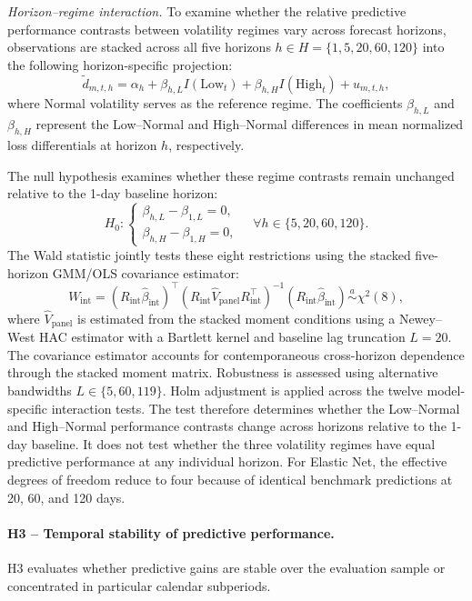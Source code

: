 \documentclass[runningheads,orivec]{llncs}
\begin{document}
\textit{Horizon--regime interaction.} To examine whether the relative predictive performance contrasts between volatility regimes vary across forecast horizons, observations are stacked across all five horizons $h\in H=\{1,5,20,60,120\}$ into the following horizon-specific projection:
\begin{equation}
\widetilde d_{m,t,h}
=
\alpha_h+\beta_{h,L}I(\mathrm{Low}_t)
+\beta_{h,H}I(\mathrm{High}_t)+u_{m,t,h},
\end{equation}
where Normal volatility serves as the reference regime. The coefficients $\beta_{h,L}$ and $\beta_{h,H}$ represent the Low--Normal and High--Normal differences in mean normalized loss differentials at horizon $h$, respectively.

The null hypothesis examines whether these regime contrasts remain unchanged relative to the 1-day baseline horizon:
\begin{equation}
H_0:
\begin{cases}
\beta_{h,L}-\beta_{1,L}=0,\\
\beta_{h,H}-\beta_{1,H}=0,
\end{cases}
\quad
\forall h\in\{5,20,60,120\}.
\end{equation}
The Wald statistic jointly tests these eight restrictions using the stacked five-horizon GMM/OLS covariance estimator:
\begin{equation}
W_{\mathrm{int}}
=
(R_{\mathrm{int}}\widehat\beta_{\mathrm{int}})^\top
\left(
R_{\mathrm{int}}\widehat V_{\mathrm{panel}}
R_{\mathrm{int}}^\top
\right)^{-1}
(R_{\mathrm{int}}\widehat\beta_{\mathrm{int}})
\overset{a}{\sim}\chi^2(8),
\end{equation}
where $\widehat V_{\mathrm{panel}}$ is estimated from the stacked moment conditions using a Newey--West HAC estimator with a Bartlett kernel and baseline lag truncation $L=20$. The covariance estimator accounts for contemporaneous cross-horizon dependence through the stacked moment matrix. Robustness is assessed using alternative bandwidths $L\in\{5,60,119\}$. Holm adjustment is applied across the twelve model-specific interaction tests. The test therefore determines whether the Low--Normal and High--Normal performance contrasts change across horizons relative to the 1-day baseline. It does not test whether the three volatility regimes have equal predictive performance at any individual horizon. For Elastic Net, the effective degrees of freedom reduce to four because of identical benchmark predictions at 20, 60, and 120 days.

\paragraph{H3 -- Temporal stability of predictive performance.} H3 evaluates whether predictive gains are stable over the evaluation sample or concentrated in particular calendar subperiods.
\end{document}

